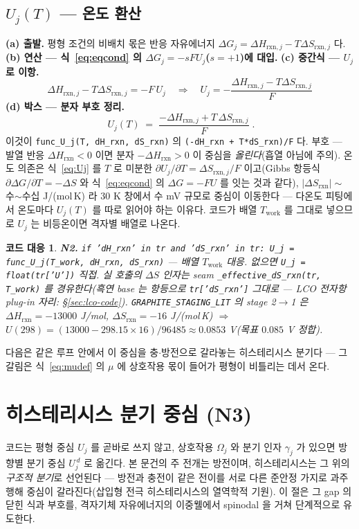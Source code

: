 \documentclass[11pt,a4paper]{article}
\newtheorem*{codebox}{코드 대응}
\newcommand{\rxn}{\mathrm{rxn}}
\newcommand{\work}{\mathrm{work}}
\newcommand{\code}[1]{\texttt{#1}}
\begin{document}
\subsection{$U_j(T)$ — 온도 환산}
\textbf{(a) 출발.} 평형 조건의 비배치 몫은 반응 자유에너지 $\Delta G_j=\Delta H_{\rxn,j}-T\Delta S_{\rxn,j}$ 다.
\textbf{(b) 연산 — 식~\eqref{eq:eqcond} 의 $\Delta G_j=-sFU_j$($s=+1$)에 대입.} \textbf{(c) 중간식 — $U_j$ 로 이항.}
\begin{equation}
\Delta H_{\rxn,j}-T\Delta S_{\rxn,j}=-F\,U_j
\quad\Longrightarrow\quad
U_j=-\frac{\Delta H_{\rxn,j}-T\Delta S_{\rxn,j}}{F}
\label{eq:Ujmid}
\end{equation}
\textbf{(d) 박스 — 분자 부호 정리.}
\begin{equation}
\boxed{\;U_j(T)\;=\;\frac{-\Delta H_{\rxn,j}+T\,\Delta S_{\rxn,j}}{F}\;.}
\label{eq:Uj}
\end{equation}
이것이 \code{func\_U\_j(T, dH\_rxn, dS\_rxn)} 의 \code{(-dH\_rxn + T*dS\_rxn)/F} 다. 부호 — 발열 반응
$\Delta H_\rxn<0$ 이면 분자 $-\Delta H_\rxn>0$ 이 중심을 \emph{올린다}(흡열 아님에 주의). 온도 의존은 식~\eqref{eq:Uj} 를
$T$ 로 미분한 $\partial U_j/\partial T=\Delta S_{\rxn,j}/F$ 이고(Gibbs 항등식 $\partial\Delta G/\partial T=-\Delta S$ 와
식~\eqref{eq:eqcond} 의 $\Delta G=-FU$ 를 잇는 것과 같다), $|\Delta S_\rxn|\sim$ 수$\sim$수십 J/(mol\,K) 라 $30$ K
창에서 수 mV 규모로 중심이 이동한다 — 다온도 피팅에서 온도마다 $U_j(T)$ 를 따로 읽어야 하는 이유다. 코드가 배열
$T_\work$ 를 그대로 넣으므로 $U_j$ 는 비등온이면 격자별 배열로 나온다.

\begin{codebox}
\textbf{N2.} \code{if 'dH\_rxn' in tr and 'dS\_rxn' in tr: U\_j = func\_U\_j(T\_work, dH\_rxn, dS\_rxn)}
— 배열 $T_\work$ 대응. 없으면 \code{U\_j = float(tr['U'])} 직접. 실 호출의 $\Delta S$ 인자는 seam
\code{\_effective\_dS\_rxn(tr, T\_work)} 를 경유한다(흑연 base 는 항등으로 \code{tr['dS\_rxn']} 그대로 —
LCO 전자항 plug-in 자리: \S\ref{sec:lco-code}). \code{GRAPHITE\_STAGING\_LIT} 의 stage 2$\to$1 은
$\Delta H_\rxn=-13000$ J/mol, $\Delta S_\rxn=-16$ J/(mol\,K) $\Rightarrow$ $U(298)=(13000-298.15\times16)/96485
\approx0.0853$ V(목표 $0.085$ V 정합).
\end{codebox}

다음은 같은 루프 안에서 이 중심을 충$\cdot$방전으로 갈라놓는 히스테리시스 분기다 — 그 갈림은 식~\eqref{eq:mudef} 의
$\mu$ 에 상호작용 몫이 들어가 평형이 비틀리는 데서 온다.

\section{히스테리시스 분기 중심 (N3)}\label{sec:hys}
코드는 평형 중심 $U_j$ 를 곧바로 쓰지 않고, 상호작용 $\Omega_j$ 와 분기 인자 $\gamma_j$ 가 있으면 방향별 분기 중심
$U_j^{\,d}$ 로 옮긴다. 본 문건의 주 전개는 방전이며, 히스테리시스는 그 위의 \emph{구조적 분기}로 선언된다 — 방전과 충전이
같은 전이를 서로 다른 준안정 가지로 과주행해 중심이 갈라진다(삽입형 전극 히스테리시스의 열역학적 기원\cite{dreyer2010}).
이 절은 그 gap 의 닫힌 식과 부호를, 격자기체 자유에너지의
이중웰에서 spinodal 을 거쳐 단계적으로 유도한다.
\end{document}
